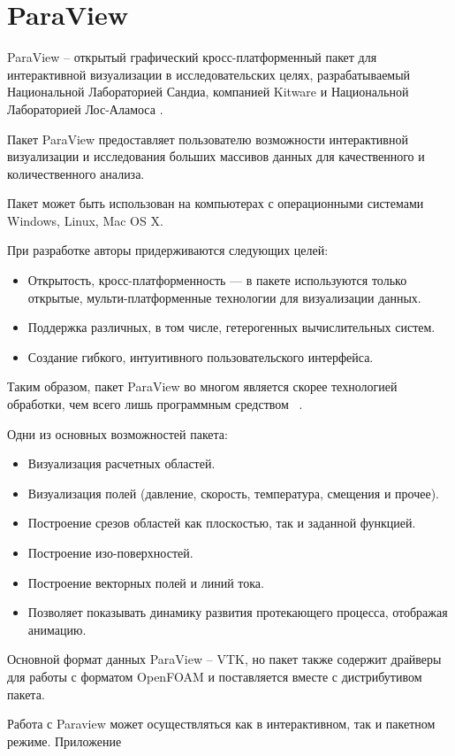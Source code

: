 \documentclass[14pt]{extreport}
\begin{document}
\section{ParaView}
ParaView -- открытый графический кросс-платформенный пакет для интерактивной визуализации в исследовательских целях, разрабатываемый Национальной Лабораторией Сандиа, компанией Kitware и Национальной Лабораторией Лос-Аламоса \cite{ParaviewAbout}.

Пакет ParaView предоставляет пользователю возможности интерактивной визуализации и исследования больших массивов данных для качественного и количественного анализа.

Пакет может быть использован на компьютерах с операционными системами Windows, Linux, Mac OS X.

При разработке авторы придерживаются следующих целей:
\begin{itemize}
\item Открытость, кросс-платформенность — в пакете используются только открытые, мульти-платформенные технологии для визуализации данных.
\item Поддержка различных, в том числе, гетерогенных вычислительных систем.
\item Создание гибкого, интуитивного пользовательского интерфейса.
\end{itemize}

Таким образом, пакет ParaView во многом является скорее технологией обработки, чем всего лишь программным средством ~\cite{ParaviewWiki}.

Одни из основных возможностей пакета:
\begin{itemize}
\item Визуализация расчетных областей.
\item Визуализация полей (давление, скорость, температура, смещения и прочее).
\item Построение срезов областей как плоскостью, так и заданной функцией.
\item Построение изо-поверхностей.
\item Построение векторных полей и линий тока.
\item Позволяет показывать динамику развития протекающего процесса, отображая анимацию. 
\end{itemize}

Основной формат данных ParaView -- VTK, но пакет также содержит драйверы для работы с форматом OpenFOAM и поставляется вместе с дистрибутивом пакета. 

Работа с Paraview может осуществляться как в интерактивном, так и пакетном режиме.
Приложение 
\end{document}
